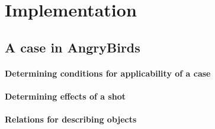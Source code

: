 \section{Implementation}\label{sec:implementation}


\subsection{A case in AngryBirds}\label{subsec:impl-case}


\paragraph{Determining conditions for applicability of a case}


\paragraph{Determining effects of a shot}


\paragraph{Relations for describing objects}




